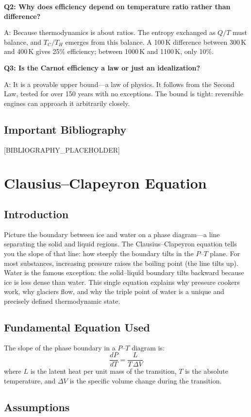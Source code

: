 \documentclass[11pt,openright]{book}
\begin{document}
\textbf{Q2: Why does efficiency depend on temperature ratio rather than difference?}

A: Because thermodynamics is about ratios. The entropy exchanged as $Q/T$ must balance, and $T_C/T_H$ emerges from this balance. A 100\,K difference between 300\,K and 400\,K gives 25\% efficiency; between 1000\,K and 1100\,K, only 10\%.

\textbf{Q3: Is the Carnot efficiency a law or just an idealization?}

A: It is a provable upper bound---a law of physics. It follows from the Second Law, tested for over 150 years with no exceptions. The bound is tight: reversible engines can approach it arbitrarily closely.
\section*{Important Bibliography}

[BIBLIOGRAPHY_PLACEHOLDER]


\chapter{Clausius--Clapeyron Equation}

\section*{Introduction}

Picture the boundary between ice and water on a phase diagram---a line separating the solid and liquid regions. The Clausius--Clapeyron equation tells you the slope of that line: how steeply the boundary tilts in the $P$--$T$ plane. For most substances, increasing pressure raises the boiling point (the line tilts up). Water is the famous exception: the solid--liquid boundary tilts backward because ice is less dense than water. This single equation explains why pressure cookers work, why glaciers flow, and why the triple point of water is a unique and precisely defined thermodynamic state.
\section*{Fundamental Equation Used}

The slope of the phase boundary in a $P$--$T$ diagram is:
\[
\frac{dP}{dT} = \frac{L}{T\,\Delta V}
\]
where $L$ is the latent heat per unit mass of the transition, $T$ is the absolute temperature, and $\Delta V$ is the specific volume change during the transition.
\section*{Assumptions}
\end{document}
